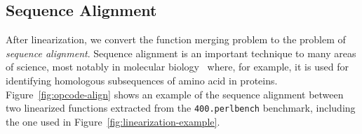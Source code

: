 
\subsection{Sequence Alignment}


After linearization, we convert the function merging problem to the problem of \textit{sequence alignment}. Sequence alignment is an
important technique to many areas of science, most notably in molecular biology~\cite{needleman70,smith81,carrillo88,wang94} where, for
example, it is used for identifying homologous subsequences of amino acid in proteins. Figure~\ref{fig:opcode-align} shows an example of
the sequence alignment between two linearized functions extracted from the \texttt{400.perlbench} benchmark, including the one used in
Figure~\ref{fig:linearization-example}.

